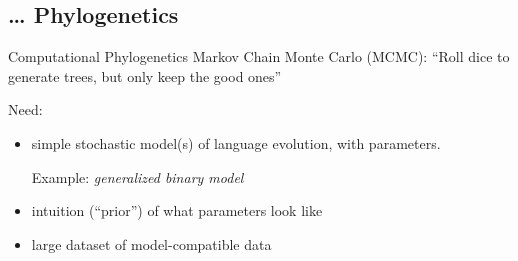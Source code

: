 \documentclass[9pt]{beamer}
\begin{document}
\subsection{… Phylogenetics}
\begin{frame}{Computational Phylogenetics}
  Markov Chain Monte Carlo (MCMC): “Roll dice to generate trees, but only keep the good ones”

  \pause
  Need:
  \begin{itemize}
  \item simple stochastic model(s) of language evolution, with parameters.

  Example: \emph{generalized binary model}

  \item intuition (“prior”) of what parameters look like
  \item large dataset of model-compatible data
  \end{itemize}

\end{frame}
\end{document}
